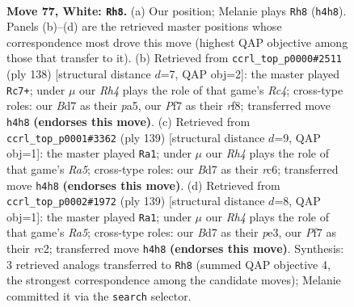 \documentclass[11pt]{article}
\begin{document}
\clearpage

\begin{figure}[p]\centering
\begin{subfigure}{0.46\textwidth}\centering
\resizebox{\linewidth}{!}{%
\newchessgame
\chessboard[
  setfen={8/3B1P2/8/k7/7R/8/5K1P/8 w - - 7 77},
  showmover=false,
  pgfstyle=straightmove, color=movearrow, markmove={h4-h8}
]}
\caption{}
\end{subfigure}\hfill
\begin{subfigure}{0.46\textwidth}\centering
\resizebox{\linewidth}{!}{%
\newchessgame
\chessboard[
  setfen={5r2/k7/8/p7/2R5/8/K1P5/8 w - - 12 70},
  showmover=false,
  pgfstyle=straightmove, color=movearrow, markmove={c4-c7}
]}
\caption{}
\end{subfigure}
\\[4pt]
\begin{subfigure}{0.46\textwidth}\centering
\resizebox{\linewidth}{!}{%
\newchessgame
\chessboard[
  setfen={8/6k1/2R5/p4K2/r7/6P1/8/8 b - - 10 70},
  showmover=false,
  pgfstyle=straightmove, color=movearrow, markmove={a4-a1}
]}
\caption{}
\end{subfigure}\hfill
\begin{subfigure}{0.46\textwidth}\centering
\resizebox{\linewidth}{!}{%
\newchessgame
\chessboard[
  setfen={8/4k3/8/p2K4/r7/4P3/2R5/8 b - - 0 70},
  showmover=false,
  pgfstyle=straightmove, color=movearrow, markmove={a4-a1}
]}
\caption{}
\end{subfigure}
\caption{\textbf{Move 77, White: \texttt{Rh8}.} (a) Our position; Melanie plays \texttt{Rh8} (\texttt{h4h8}). Panels (b)--(d) are the retrieved master positions whose correspondence most drove this move (highest QAP objective among those that transfer to it). (b) Retrieved from \texttt{ccrl\_top\_p0000\#2511} (ply 138) [structural distance $d$=7, QAP obj=2]: the master played \texttt{Rc7+}; under $\mu$ our \emph{Rh4} plays the role of that game's \emph{Rc4}; cross-type roles: our \emph{B}d7 as their \emph{p}a5, our \emph{P}f7 as their \emph{r}f8; transferred move \texttt{h4h8} \textbf{(endorses this move)}. (c) Retrieved from \texttt{ccrl\_top\_p0001\#3362} (ply 139) [structural distance $d$=9, QAP obj=1]: the master played \texttt{Ra1}; under $\mu$ our \emph{Rh4} plays the role of that game's \emph{Ra5}; cross-type roles: our \emph{B}d7 as their \emph{r}c6; transferred move \texttt{h4h8} \textbf{(endorses this move)}. (d) Retrieved from \texttt{ccrl\_top\_p0002\#1972} (ply 139) [structural distance $d$=8, QAP obj=1]: the master played \texttt{Ra1}; under $\mu$ our \emph{Rh4} plays the role of that game's \emph{Ra5}; cross-type roles: our \emph{B}d7 as their \emph{p}e3, our \emph{P}f7 as their \emph{r}c2; transferred move \texttt{h4h8} \textbf{(endorses this move)}. Synthesis: 3 retrieved analogs transferred to \texttt{Rh8} (summed QAP objective 4, the strongest correspondence among the candidate moves); Melanie committed it via the \texttt{search} selector.}
\label{fig:thought-m152}
\end{figure}
\end{document}
